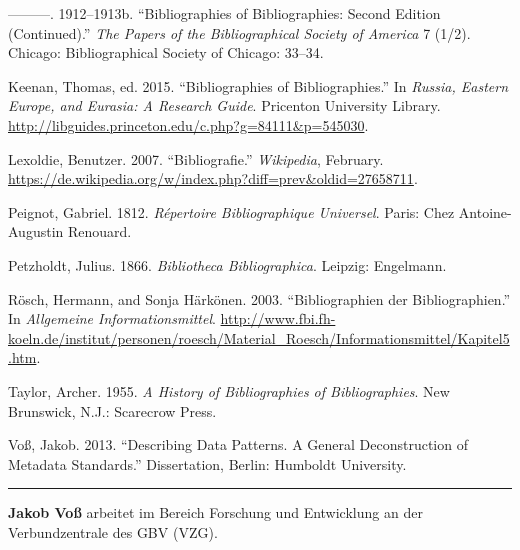 \documentclass[a4paper,
fontsize=11pt,
oneside,
numbers=noperiodatend,
parskip=half-,
bibliography=totoc,
final
]{scrartcl}
\begin{document}
---------. 1912--1913b. ``Bibliographies of Bibliographies: Second
Edition (Continued).'' \emph{The Papers of the Bibliographical Society
of America} 7 (1/2). Chicago: Bibliographical Society of Chicago:
33--34.

Keenan, Thomas, ed. 2015. ``Bibliographies of Bibliographies.'' In
\emph{Russia, Eastern Europe, and Eurasia: A Research Guide}. Pricenton
University Library.
\url{http://libguides.princeton.edu/c.php?g=84111\&p=545030}.

Lexoldie, Benutzer. 2007. ``Bibliografie.'' \emph{Wikipedia}, February.
\url{https://de.wikipedia.org/w/index.php?diff=prev\&oldid=27658711}.

Peignot, Gabriel. 1812. \emph{Répertoire Bibliographique Universel}.
Paris: Chez Antoine-Augustin Renouard.

Petzholdt, Julius. 1866. \emph{Bibliotheca Bibliographica}. Leipzig:
Engelmann.

Rösch, Hermann, and Sonja Härkönen. 2003. ``Bibliographien der
Bibliographien.'' In \emph{Allgemeine Informationsmittel}.
\url{http://www.fbi.fh-koeln.de/institut/personen/roesch/Material_Roesch/Informationsmittel/Kapitel5.htm}.

Taylor, Archer. 1955. \emph{A History of Bibliographies of
Bibliographies}. New Brunswick, N.J.: Scarecrow Press.

Voß, Jakob. 2013. ``Describing Data Patterns. A General Deconstruction
of Metadata Standards.'' Dissertation, Berlin: Humboldt University.

\begin{center}\rule{0.5\linewidth}{\linethickness}\end{center}

\textbf{Jakob Voß} arbeitet im Bereich Forschung und Entwicklung an der
Verbundzentrale des GBV (VZG).
\end{document}
